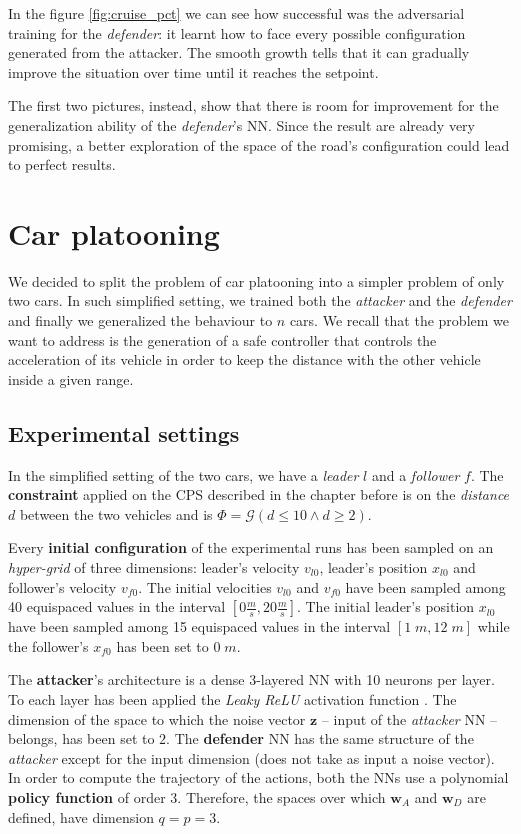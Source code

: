 In the figure \ref{fig:cruise_pct} we can see how successful was the adversarial training for the \textit{defender}: it learnt how to face every possible configuration generated from the attacker.
The smooth growth tells that it can gradually improve the situation over time until it reaches the setpoint.

The first two pictures, instead, show that there is room for improvement for the generalization ability of the \textit{defender}'s NN.
Since the result are already very promising, a better exploration of the space of the road's configuration could lead to perfect results.

\section{Car platooning}
We decided to split the problem of car platooning into a simpler problem of only two cars.
In such simplified setting, we trained both the \textit{attacker} and the \textit{defender} and finally we generalized the behaviour to $n$ cars.
We recall that the problem we want to address is the generation of a safe controller that controls the acceleration of its vehicle in order to keep the distance with the other vehicle inside a given range.

\subsection{Experimental settings}
In the simplified setting of the two cars, we have a \textit{leader} $l$ and a \textit{follower} $f$.
The \textbf{constraint} applied on the CPS described in the chapter before is on the \textit{distance} $d$ between the two vehicles and is $\Phi = \mathcal{G}(d \leq 10 \wedge d \geq 2)$.

Every \textbf{initial configuration} of the experimental runs has been sampled on an \textit{hyper-grid} of three dimensions: leader's velocity $v_{l0}$, leader's position $x_{l0}$ and follower's velocity $v_{f0}$.
The initial velocities $v_{l0}$ and $v_{f0}$ have been sampled among 40 equispaced values in the interval $[0 \frac{m}{s}, 20 \frac{m}{s}]$.
The initial leader's position $x_{l0}$ have been sampled among 15 equispaced values in the interval $[1 \; m,12 \; m]$ while the follower's $x_{f0}$ has been set to $0 \; m$.

The \textbf{attacker}'s architecture is a dense 3-layered NN with 10 neurons per layer.
To each layer has been applied the \textit{Leaky ReLU} activation function \cite{xu2015empirical}.
The dimension of the space to which the noise vector $\textbf{z}$ -- input of the \textit{attacker} NN -- belongs, has been set to $2$.
The \textbf{defender} NN has the same structure of the \textit{attacker} except for the input dimension (does not take as input a noise vector).
In order to compute the trajectory of the actions, both the NNs use a polynomial \textbf{policy function} of order 3.
Therefore, the spaces over which $\textbf{w}_A$ and $\textbf{w}_D$ are defined, have dimension $q = p = 3$.

